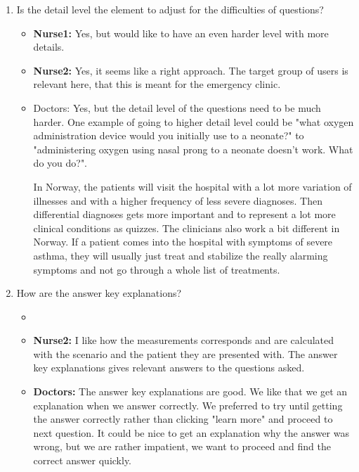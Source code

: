 \begin{enumerate}
\begin{itemize}
	\end{itemize}
	\item Is the detail level the element to adjust for the difficulties of questions?
	\begin{itemize}
		\item \textbf{Nurse1:} Yes, but would like to have an even harder level with more details.
		\item \textbf{Nurse2:} Yes, it seems like a right approach. The target group of users is relevant here, that this is meant for the emergency clinic.
		\item {Doctors:} Yes, but the detail level of the questions need to be much harder. One example of going to higher detail level could be "what oxygen administration device would you initially use to a neonate?" to "administering oxygen using nasal prong to a neonate doesn't work. What do you do?". 
		
		In Norway, the patients will visit the hospital with a lot more variation of illnesses and with a higher frequency of less severe diagnoses. Then differential diagnoses gets more important and to represent a lot more clinical conditions as quizzes. The clinicians also work a bit different in Norway. If a patient comes into the hospital with symptoms of severe asthma, they will usually just treat and stabilize the really alarming symptoms and not go through a whole list of treatments.
	\end{itemize}
	\item How are the answer key explanations?
	\begin{itemize}
		\item 
		\item \textbf{Nurse2:} I like how the measurements corresponds and are calculated with the scenario and the patient they are presented with. The answer key explanations gives relevant answers to the questions asked.
		\item \textbf{Doctors:} The answer key explanations are good. We like that we get an explanation when we answer correctly. We preferred to try until getting the answer correctly rather than clicking "learn more" and proceed to next question. It could be nice to get an explanation why the answer was wrong, but we are rather impatient, we want to proceed and find the correct answer quickly.
	\end{itemize}
\end{enumerate}

